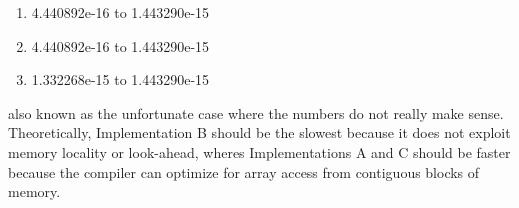 \documentclass{scrartcl}
\begin{document}
\begin{enumerate}
    \begin{enumerate}[label=(\alph*)]
      \item 4.440892e-16 to 1.443290e-15
      \item 4.440892e-16 to 1.443290e-15
      \item 1.332268e-15 to 1.443290e-15
    \end{enumerate}
    also known as the unfortunate case where the numbers do not really make sense. Theoretically, Implementation B should be the slowest because it does not exploit memory locality or look-ahead, wheres Implementations A and C should be faster because the compiler can optimize for array access from contiguous blocks of memory.
  \end{enumerate}
\end{document}
